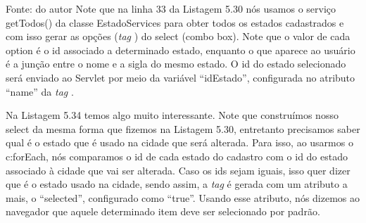  

 
Fonte: do autor
Note que na linha 33 da Listagem 5.30 nós usamos o serviço getTodos() da classe EstadoServices para obter todos os estados cadastrados e com isso gerar as opções (\textit{tag} ) do select (combo box). Note que o valor de cada option é o id associado a determinado estado, enquanto o que aparece ao usuário é a junção entre o nome e a sigla do mesmo estado. O id do estado selecionado será enviado ao Servlet por meio da variável ``idEstado'', configurada no atributo ``name'' da \textit{tag} .



Na Listagem 5.34 temos algo muito interessante. Note que construímos nosso select da mesma forma que fizemos na Listagem 5.30, entretanto precisamos saber qual é o estado que é usado na cidade que será alterada. Para isso, ao usarmos o c:forEach, nós comparamos o id de cada estado do cadastro com o id do estado associado à cidade que vai ser alterada. Caso os ids sejam iguais, isso quer dizer que é o estado usado na cidade, sendo assim, a \textit{tag}  é gerada com um atributo a mais, o ``selected'', configurado como ``true''. Usando esse atributo, nós dizemos ao navegador que aquele determinado item deve ser selecionado por padrão.

 
